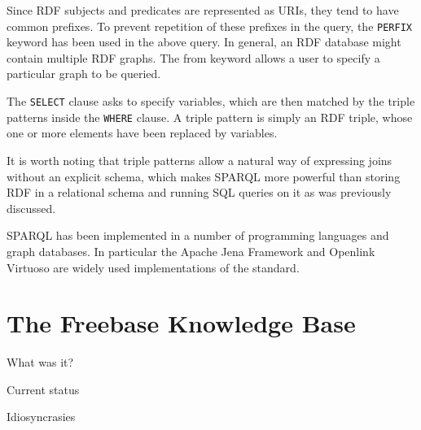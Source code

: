 Since RDF subjects and predicates are represented as URIs, they tend to have common prefixes. To prevent repetition of these prefixes in the query, the \verb|PERFIX| keyword has been used in the above query. In general, an RDF database might contain multiple RDF graphs. The from keyword allows a user to specify a particular graph to be queried.

The \verb|SELECT| clause asks to specify variables, which are then matched by the triple patterns inside the \verb|WHERE| clause. A triple pattern is simply an RDF triple, whose one or more elements have been replaced by variables. 

It is worth noting that triple patterns allow a natural way of expressing joins without an explicit schema, which makes SPARQL more powerful than storing RDF in a relational schema and running SQL queries on it as was previously discussed.

SPARQL has been implemented in a number of programming languages and graph databases. In particular the Apache Jena Framework and Openlink Virtuoso are widely used implementations of the standard.

\section{The Freebase Knowledge Base}

What was it?

Current status

Idiosyncrasies

